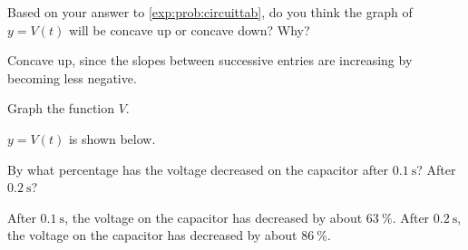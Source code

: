 \begin{exercises}
\begin{problem}
\begin{subproblem}
\begin{shortsolution}
\begin{tabular}[t]{S[table-format=1.1]S[table-format=2.3]}
		\end{tabular}
	\end{shortsolution}
\end{subproblem}
\begin{subproblem}
	Based on your answer to \cref{exp:prob:circuittab}, do you think the 
	graph of $y=V(t)$ will be concave up or concave down? Why?
	\begin{shortsolution}
		Concave up, since the slopes between successive entries 
		are increasing by becoming less negative.
	\end{shortsolution}
\end{subproblem}
\begin{subproblem}
	Graph the function $V$.
	\begin{shortsolution}
		$y=V(t)$ is shown below.
																			
	\end{shortsolution}
\end{subproblem}
\begin{subproblem}
	By what percentage has the voltage decreased on the capacitor after $\SI{0.1}{\second}$? 
	After $\SI{0.2}{\second}$?
	\begin{shortsolution}
		After $\SI{0.1}{\second}$, the voltage on the capacitor has decreased by about
		$\SI{63}{\percent}$. After $\SI{0.2}{\second}$, the voltage on the 
		capacitor has decreased by about $\SI{86}{\percent}$.
	\end{shortsolution}
\end{subproblem}
\end{problem}
			

\end{exercises}
